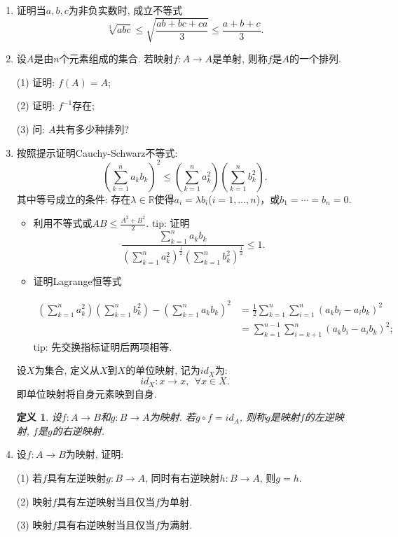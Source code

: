 \documentclass[UTF8,11pt, a4paper, oneside, fontset=none]{ctexbook}
\newtheorem{definition}[theorem]{定义}
\begin{document}
\begin{enumerate}
\item 证明当$a, b, c$为非负实数时, 成立不等式
\[
\sqrt[3]{abc} \leq \sqrt{\frac{ab + bc + ca}{3}} \leq \frac{a+b+c}{3}.
\]

\item 设$A$是由$n$个元素组成的集合. 若映射$f : A \to A$是单射, 则称$f$是$A$的一个排列.

(1) 证明: $f(A) = A$;

(2) 证明: $f^{-1}$存在;

(3) 问: $A$共有多少种排列?


\item 按照提示证明Cauchy-Schwarz不等式:
\[ \left( \sum_{k=1}^{n}a_k b_k\right)^2 \leq \left( \sum_{k=1}^{n}a_k^2\right) \left( \sum_{k=1}^{n}b_k^2\right).
\]
其中等号成立的条件: $\text{存在}\lambda \in \mathbb R$使得$a_i=\lambda b_i$($i=1,\ldots,n$)，或$b_1=\cdots=b_n=0$.

\begin{itemize}
\item[(a)] 利用不等式或$AB \leq \frac{A^2+B^2}{2}$. tip: 证明
\[
\frac{ \sum\limits_{k=1}^n a_k b_k }{ \left( \sum\limits_{k=1}^n a_k^2 \right)^{\frac{1}{2}}  \left( \sum\limits_{k=1}^n b_k^2 \right)^{\frac{1}{2}} }  \leq 1.
\]

\item[(b)] 证明Lagrange恒等式

\begin{align*}
\left(\sum\limits_{k=1}^n a_k^2 \right) \left( \sum\limits_{k=1}^n b_k^2\right) - \left( \sum\limits_{k=1}^n a_k b_k \right)^2 &= \frac{1}{2} \sum\limits_{k=1}^n \sum\limits_{i=1}^n (a_kb_i - a_ib_k)^2 \\
&=  \sum\limits_{k=1}^{n-1} \sum\limits_{i=k+1}^n (a_kb_i - a_ib_k)^2;
\end{align*}
tip: 先交换指标证明后两项相等.

\end{itemize}


\begin{tcolorbox}[title=注记, colback=white]
设$X$为集合, 定义从$X$到$X$的单位映射, 记为$id_X$为:
\[
id_X: x \to x, \ \ \forall x \in X.
\]
即单位映射将自身元素映到自身.


\begin{definition}
设$f : A \to B$和$g : B \to A$为映射. 若$g \circ f = id_A$, 则称$g$是映射$f$的左逆映射, $f$是$g$的右逆映射. 

\end{definition}
\end{tcolorbox}

\item 设$f: A \to B$为映射, 证明:

(1) 若$f$具有左逆映射$g: B \to A$, 同时有右逆映射$h : B \to A$, 则$g = h$.

(2) 映射$f$具有左逆映射当且仅当$f$为单射.

(3) 映射$f$具有右逆映射当且仅当$f$为满射. 

\end{enumerate}
\end{document}
